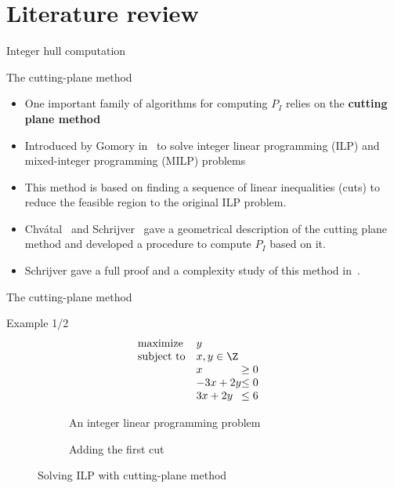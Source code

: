 \section{Literature review}
\begin{frame}{Integer hull computation}
	\begin{block}{The cutting-plane method}
		\begin{itemize}
			\item One important family of algorithms for computing
			$P_I$ relies on the {\bf cutting plane method}
			\item Introduced by Gomory in~\cite{DBLP:books/daglib/p/Gomory10} to solve integer
			linear programming (ILP) and mixed-integer programming (MILP) problems
			\item This method is based on finding a sequence of linear inequalities (cuts) to reduce the feasible region to the original ILP problem. 
			\item Chv\'atal~\cite{DBLP:journals/dm/Chvatal73a} and
			Schrijver~\cite{schrijver1980cutting} gave a geometrical description of the cutting plane method and developed a procedure to
			compute $P_I$ based on it. 
			\item Schrijver gave a full
			proof and a complexity study of this method
			in~\cite{DBLP:journals/networks/Rajan90}.
		\end{itemize}
	\end{block}
\end{frame}

\begin{frame}{The cutting-plane method}
	\begin{block}{Example 1/2}
\begin{equation}
	\begin{array}{ll@{}ll}
		\text{maximize}  & \displaystyle y & &\\
		\text{subject to}& x,y \in \Z &&\\
		&x &\ge 0&\\
		& -3x + 2y &\le 0 &\\
		& 3x + 2y &\le 6&		
	\end{array}
	\label{eq:ilp}
\end{equation}
\begin{figure}[htb]
	\centering %
	\begin{subfigure}{0.5\textwidth}
		\resizebox{\linewidth}{!}{}
		\caption{An integer linear programming problem}
		\label{fig:cut0}
	\end{subfigure}\hfil %
	\begin{subfigure}{0.5\textwidth}
		\resizebox{\linewidth}{!}{}
		\caption{Adding the first cut}
		\label{fig:cut1}
	\end{subfigure}
	\caption{Solving ILP with cutting-plane method}
	\label{fig:cut}
\end{figure}
	\end{block}
\end{frame}

